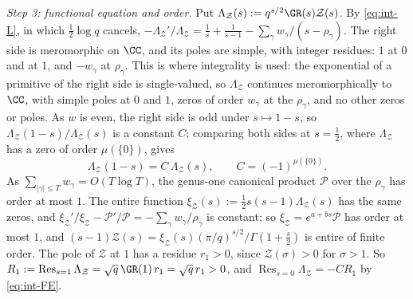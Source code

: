 \emph{Step 3: functional equation and order.} Put $\Lambda_{\mathcal Z}(s):=q^{s/2}\GR(s)\mathcal Z(s)$. By \eqref{eq:int-L}, in which $\frac12\log q$
cancels, $-\Lambda_{\mathcal Z}'/\Lambda_{\mathcal Z}=\frac1s+\frac1{s-1}-\sum_\gamma w_\gamma/(s-\rho_\gamma)$. The right side is meromorphic on $\CC$, and its
poles are simple, with integer residues: $1$ at $0$ and at $1$, and $-w_\gamma$ at $\rho_\gamma$. This is where integrality is used: the
exponential of a primitive of the right side is single-valued, so $\Lambda_{\mathcal Z}$ continues meromorphically to $\CC$, with simple poles at
$0$ and $1$, zeros of order $w_\gamma$ at the $\rho_\gamma$, and no other zeros or poles. As $w$ is even, the right side is odd under $s\mapsto1-s$,
so $\Lambda_{\mathcal Z}(1-s)/\Lambda_{\mathcal Z}(s)$ is a constant $C$; comparing both sides at $s=\frac12$, where $\Lambda_{\mathcal Z}$ has a zero of order
$\mu(\{0\})$, gives
\begin{equation}\label{eq:int-FE}
\Lambda_{\mathcal Z}(1-s)=C\,\Lambda_{\mathcal Z}(s),\qquad C=(-1)^{\mu(\{0\})}.
\end{equation}
As $\sum_{|\gamma|\le T}w_\gamma=O(T\log T)$, the genus-one canonical product $\mathcal P$ over the $\rho_\gamma$ has order at most $1$. The entire
function $\xi_{\mathcal Z}(s):=\frac12s(s-1)\Lambda_{\mathcal Z}(s)$ has the same zeros, and $\xi_{\mathcal Z}'/\xi_{\mathcal Z}-\mathcal P'/\mathcal P=-\sum_\gamma
w_\gamma/\rho_\gamma$ is constant; so $\xi_{\mathcal Z}=e^{a+bs}\mathcal P$ has order at most $1$, and $(s-1)\mathcal Z(s)=\xi_{\mathcal Z}(s)(\pi/q)^{s/2}/\Gamma(1+\frac s2)$ is entire of
finite order. The pole of
$\mathcal Z$ at $1$ has a residue $r_1>0$, since $\mathcal Z(\sigma)>0$ for $\sigma>1$. So $R_1:=\operatorname{Res}_{s=1}\Lambda_{\mathcal Z}=\sqrt q\,\GR(1)\,r_1
=\sqrt q\,r_1>0$, and $\operatorname{Res}_{s=0}\Lambda_{\mathcal Z}=-CR_1$ by \eqref{eq:int-FE}.

